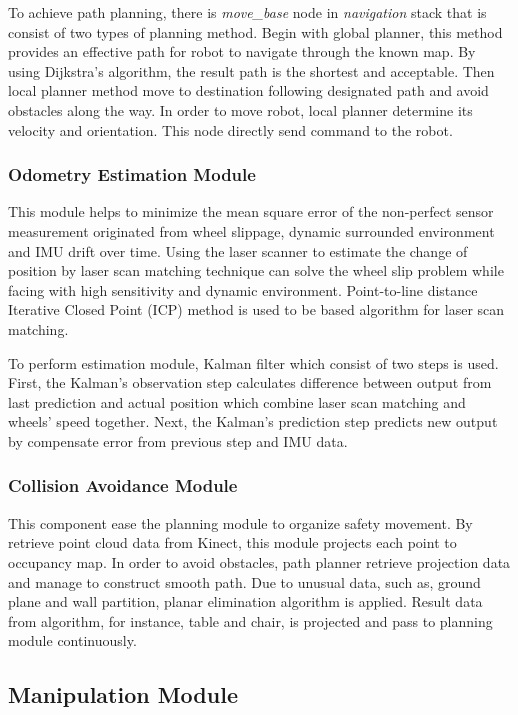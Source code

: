 \documentclass{llncs}
\begin{document}
To achieve path planning, there is \textit{move\_base} node in \textit{navigation} stack that is consist of two types of planning method. Begin with global planner, this method provides an effective path for robot to navigate through the known map. By using Dijkstra's algorithm, the result path is the shortest and acceptable. Then local planner method move to destination following designated path and avoid obstacles along the way. In order to move robot, local planner determine its velocity and orientation. This node directly send command to the robot.

\subsubsection{Odometry Estimation Module}

This module helps to minimize the mean square error of the non-perfect sensor measurement originated from wheel slippage, dynamic surrounded environment and IMU drift over time. Using the laser scanner to estimate the change of position by laser scan matching technique can solve the wheel slip problem while facing with high sensitivity and dynamic environment. Point-to-line distance Iterative Closed Point (ICP)\cite{icp1}\cite{icp2} method is used to be based algorithm for laser scan matching.

To perform estimation module, Kalman filter which consist of two steps is used. First, the Kalman's observation step calculates difference between output from last prediction and actual position which combine laser scan matching and wheels' speed together. Next, the Kalman's prediction step predicts new output by compensate error from previous step and IMU data\cite{odom}.

\subsubsection{Collision Avoidance Module}

This component ease the planning module to organize safety movement. By retrieve point cloud data from Kinect, this module projects each point to occupancy map. In order to avoid obstacles, path planner retrieve projection data and manage to construct smooth path. Due to unusual data, such as, ground plane and wall partition, planar elimination algorithm is applied. Result data from algorithm, for instance, table and chair, is projected and pass to planning module continuously\cite{avoid}.

\subsection{Manipulation Module}
\end{document}
